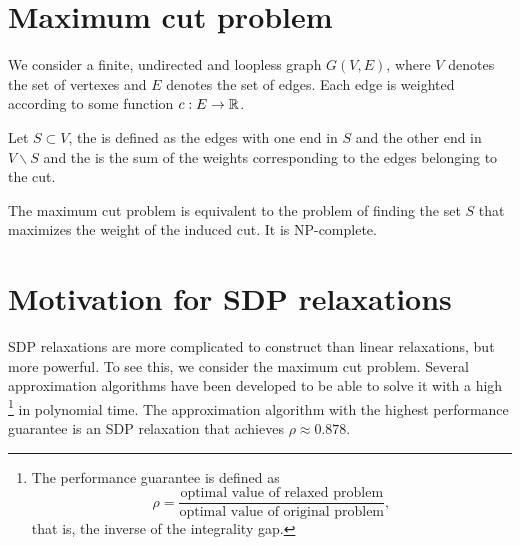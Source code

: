\documentclass[a4paper,twoside,justified]{tufte-handout}
\begin{document}
 

\section{Maximum cut problem\cite{poljak1995maximumcut}}
We consider a finite, undirected and loopless graph $G(V,E)$, where $V$ denotes the set of vertexes and $E$ denotes the set of edges. Each edge is weighted according to some function $c:E\rightarrow \mathbb{R}$. 

Let $S\subset V$, the  is defined as the edges with one end in $S$ and the other end in $V\backslash S$ and the  is the sum of the weights corresponding to the edges belonging to the cut. 

The maximum cut problem is equivalent to the problem of finding the set $S$ that maximizes the weight of the induced cut. It is NP-complete\cite{karp1972NPhard}.



\section{Motivation for SDP relaxations}
SDP relaxations are more complicated to construct than linear relaxations, but more powerful. To see this, we consider the maximum cut problem. Several approximation algorithms have been developed to be able to solve it with a high \footnote{The performance guarantee is defined as
\begin{equation*}
\rho=\frac{\text{optimal value of relaxed problem}}{\text{optimal value of original problem}},
\end{equation*}
that is, the inverse of the integrality gap.} in polynomial time. The approximation algorithm with the highest performance guarantee is an SDP relaxation that achieves $\rho\approx 0.878$.
\end{document}

